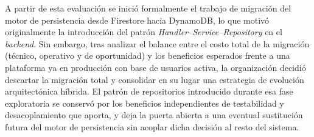 A partir de esta evaluación se inició formalmente el trabajo de migración del motor de persistencia desde Firestore hacia DynamoDB, lo que motivó originalmente la introducción del patrón \textit{Handler--Service--Repository} en el \textit{backend}. Sin embargo, tras analizar el balance entre el costo total de la migración (técnico, operativo y de oportunidad) y los beneficios esperados frente a una plataforma ya en producción con base de usuarios activa, la organización decidió descartar la migración total y consolidar en su lugar una estrategia de evolución arquitectónica híbrida. El patrón de repositorios introducido durante esa fase exploratoria se conservó por los beneficios independientes de testabilidad y desacoplamiento que aporta, y deja la puerta abierta a una eventual sustitución futura del motor de persistencia sin acoplar dicha decisión al resto del sistema.
